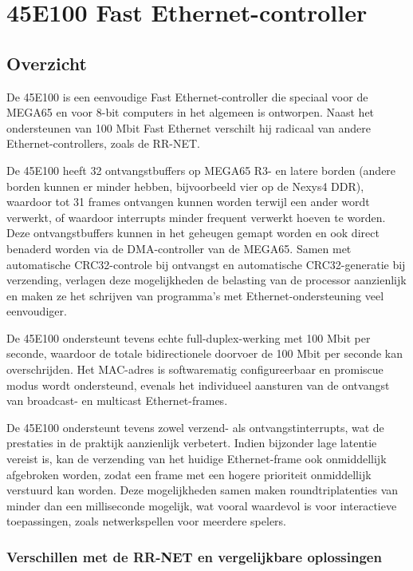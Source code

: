 \chapter{45E100 Fast Ethernet-controller}

\section{Overzicht}

De 45E100 is een eenvoudige Fast Ethernet-controller die speciaal voor de MEGA65 en voor 8-bit computers in het algemeen is ontworpen. Naast het ondersteunen van 100 Mbit Fast Ethernet verschilt hij radicaal van andere Ethernet-controllers, zoals de RR-NET.

De 45E100 heeft 32 ontvangstbuffers op MEGA65 R3- en latere borden (andere borden kunnen er minder hebben, bijvoorbeeld vier op de Nexys4 DDR), waardoor tot 31 frames ontvangen kunnen worden terwijl een ander wordt verwerkt, of waardoor interrupts minder frequent verwerkt hoeven te worden. Deze ontvangstbuffers kunnen in het geheugen gemapt worden en ook direct benaderd worden via de DMA-controller van de MEGA65. Samen met automatische CRC32-controle bij ontvangst en automatische CRC32-generatie bij verzending, verlagen deze mogelijkheden de belasting van de processor aanzienlijk en maken ze het schrijven van programma's met Ethernet-ondersteuning veel eenvoudiger.

De 45E100 ondersteunt tevens echte full-duplex-werking met 100 Mbit per seconde, waardoor de totale bidirectionele doorvoer de 100 Mbit per seconde kan overschrijden. Het MAC-adres is softwarematig configureerbaar en promiscue modus wordt ondersteund, evenals het individueel aansturen van de ontvangst van broadcast- en multicast Ethernet-frames.

De 45E100 ondersteunt tevens zowel verzend- als ontvangstinterrupts, wat de prestaties in de praktijk aanzienlijk verbetert. Indien bijzonder lage latentie vereist is, kan de verzending van het huidige Ethernet-frame ook onmiddellijk afgebroken worden, zodat een frame met een hogere prioriteit onmiddellijk verstuurd kan worden. Deze mogelijkheden samen maken roundtriplatenties van minder dan een milliseconde mogelijk, wat vooral waardevol is voor interactieve toepassingen, zoals netwerkspellen voor meerdere spelers.

\subsection{Verschillen met de RR-NET en vergelijkbare oplossingen}

